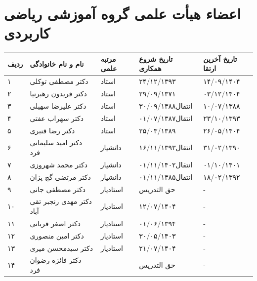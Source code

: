 \documentclass[
  letterpaper,
  DIV=11,
  numbers=noendperiod]{scrreprt}
\newcounter{none} %
\begin{document}
\section{اعضاء هیأت علمی گروه آموزشی ریاضی
کاربردی}\label{ux627ux639ux636ux627ux621-ux647ux6ccux623ux62a-ux639ux644ux645ux6cc-ux6afux631ux648ux647-ux622ux645ux648ux632ux634ux6cc-ux631ux6ccux627ux636ux6cc-ux6a9ux627ux631ux628ux631ux62fux6cc}

{\def\LTcaptype{none} %
\begin{longtable}[]{@{}
  >{\raggedright\arraybackslash}p{}
  >{\raggedright\arraybackslash}p{}
  >{\raggedright\arraybackslash}p{}
  >{\raggedright\arraybackslash}p{}
  >{\raggedright\arraybackslash}p{}@{}}
\toprule\noalign{}
\begin{minipage}[b]{\linewidth}\raggedright
ردیف
\end{minipage} & \begin{minipage}[b]{\linewidth}\raggedright
نام و نام خانوادگی
\end{minipage} & \begin{minipage}[b]{\linewidth}\raggedright
مرتبه علمی
\end{minipage} & \begin{minipage}[b]{\linewidth}\raggedright
تاریخ شروع همکاری
\end{minipage} & \begin{minipage}[b]{\linewidth}\raggedright
تاریخ آخرین ارتقا
\end{minipage} \\
\midrule\noalign{}
\endhead
\bottomrule\noalign{}
\endlastfoot
۱ & دکتر مصطفی توکلی & استاد & ۲۴/۱۲/۱۳۹۳ & ۱۴/۰۹/۱۴۰۴ \\
۲ & دکتر فریدون رهبرنیا & استاد & ۲۹/۰۹/۱۳۷۱ & ۰۳/۱۲/۱۴۰۴ \\
۳ & دکتر علیرضا سهیلی & استاد & انتقال۳۰/۰۹/۱۳۸۸ & ۱۰/۰۷/۱۳۸۸ \\
۴ & دکتر سهراب عفتی & استاد & انتقال۰۱/۰۷/۱۳۸۷ & ۲۳/۱۰/۱۳۹۳ \\
۵ & دکتر رضا قنبری & استاد & ۲۵/۰۳/۱۳۸۹ & ۲۶/۰۵/۱۴۰۴ \\
۶ & دکتر امید سلیمانی فرد & دانشیار & انتقال۱۶/۱۱/۱۳۹۳ & ۳۱/۰۲/۱۳۹۰ \\
۷ & دکتر محمد شهروزی & دانشیار & انتقال۰۱/۱۱/۱۴۰۲ & ۰۱/۱۰/۱۴۰۱ \\
۸ & دکتر مرتضی گچ پزان & دانشیار & انتقال۰۱/۱۱/۱۳۸۵ & ۱۸/۰۲/۱۳۹۲ \\
۹ & دکتر مصطفی جانی & استادیار & حق التدریس & - \\
۱۰ & دکتر مهدی رنجبر تقی آباد & استادیار & ۱۲/۰۷/۱۴۰۴ & - \\
۱۱ & دکتر اصغر قربانی & استادیار & ۰۱/۰۶/۱۳۹۴ & - \\
۱۲ & دکتر امین منصوری & استادیار & ۳۰/۰۵/۱۴۰۳ & - \\
۱۳ & دکتر سیدمحسن میری & استادیار & ۲۱/۰۷/۱۴۰۴ & - \\
۱۴ & دکتر فائزه رضوان فرد & & حق التدریس & - \\
\end{longtable}
}
\end{document}

